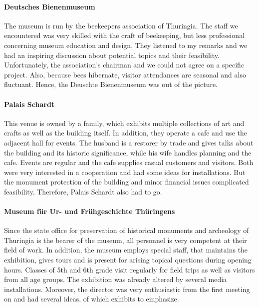 \paragraph{Deutsches Bienenmuseum} 

The museum is run by the beekeepers association of Thuringia. The staff we encountered was very skilled with the craft of beekeeping, but less professional concerning museum education and design. They listened to my remarks and we had an inspiring discussion about potential topics and their feasibility. Unfortunately, the association's chairman and we could not agree on a specific project. Also, because bees hibernate, visitor attendances are seasonal and also fluctuant. Hence, the Deuschte Bienenmuseum was out of the picture.

\paragraph{Palais Schardt} 

This venue is owned by a family, which exhibits multiple collections of art and crafts as well as the building itself. In addition, they operate a cafe and use the adjacent hall for events. The husband is a restorer by trade and gives talks about the building and its historic significance, while his wife handles planning and the cafe. Events are regular and the cafe supplies casual customers and visitors. Both were very interested in a cooperation and had some ideas for installations. But the monument protection of the building and minor financial issues complicated feasibility. Therefore, Palais Schardt also had to go.    

\paragraph{Museum für Ur- und Frühgeschichte Thüringens} 

Since the state office for preservation of historical monuments and archeology of Thuringia is the bearer of the museum, all personnel is very competent at their field of work. In addition, the museum employs special staff, that maintains the exhibition, gives tours and is present for arising topical questions during opening hours. Classes of 5th and 6th grade visit regularly for field trips as well as visitors from all age groups. The exhibition was already altered by several media installations. Moreover, the director was very enthusiastic from the first meeting on and had several ideas, of which exhibits to emphasize.

